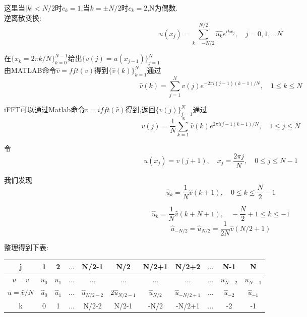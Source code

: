 \documentclass[12pt]{article}
\begin{document}
\begin{CJK}{UTF8}{gkai}
   这里当$|k|< N/2$时$c_k=1$,当$k=\pm N/2$时$c_k=2$,N为偶数.\\
   
    逆离散变换:\\
  
  $$u(x_j)=\sum_{k=-N/2}^{N/2} \hat{u_k}e^{ikx_j},\quad j=0,1,\dots N$$
  
  在$\{x_k=2\pi k /N\}_{k=0}^{N-1}$给出$\{v(j)=u(x_{j-1})\}_{j=1}^{N}$\\
  
 由MATLAB命令$ \hat{v}=fft(v)$得到$\{\hat{v}(k)\}_{k=1}^N$通过\\
 
 $$\hat{v}(k)=\sum_{j=1}^{N}v(j)e^{-2\pi i(j-1)(k-1)/N},\quad 1\leq k \leq N$$
 
 iFFT可以通过Matlab命令$v=ifft(\hat  {v})$得到,返回$\{v(j)\}_{j=1}^N$通过\\
 
 $$v(j)=\dfrac{1}{N}\sum_{k=1}^{N}\hat{v}(k)e^{2\pi i(j-1(k-1)/N}, \quad 1\leq j\leq N$$
 
 令\\
 
 $$u(x_j)=v(j+1),\quad x_j=\dfrac{2\pi j}{N},\quad 0\leq j \leq N-1$$
 
 我们发现\\
 
 $$ \hat{u}_k=\dfrac{1}{N}\hat{v}(k+1), \quad 0\leq k \leq \dfrac{N}{2}-1$$
 
 $$ \hat{u}_k=\dfrac{1}{N}\hat{v}(k+N+1), \quad -\dfrac{N}{2}+1\leq k \leq-1$$
 $$ \hat{u}_{-N/2}=\hat{u}_{N/2} = \dfrac{1}{2N}\hat{v}(N/2+1)$$
 
 整理得到下表:\\
 
\begin{table}[H]
	\centering
	\begin{tabular}{ccccccccccc}
		
		\toprule
		j&1& 2  &$\dots$&N/2-1&N/2&N/2+1&N/2+2&$\dots$&N-1&N\\
		\midrule    
       $u=v$&$u_0$&$u_1$&$\dots$&$\dots$&$\dots$&$\dots$&$\dots$&$\dots$&$u_{N-2}$&$u_{N-1}$\\
       $\hat{u}=\hat{v}/N$&$\hat{u}_0$&$\hat{u}_1$&$\dots$&$\hat{u}_{N/2-2}$&$2\hat{u}_{N/2-1}$&$\hat{u}_{N/2}$&$\hat{u}_{-N/2+1}$&$\dots$&$\hat{u}_{-2}$&$\hat{u}_{-1}$\\
       k&0&1&$\dots$&N/2-2&N/2-1&-N/2&-N/2+1&$\dots$&-2&-1\\
		\bottomrule
	\end{tabular}
\end{table} 


\end{CJK}
\end{document}
